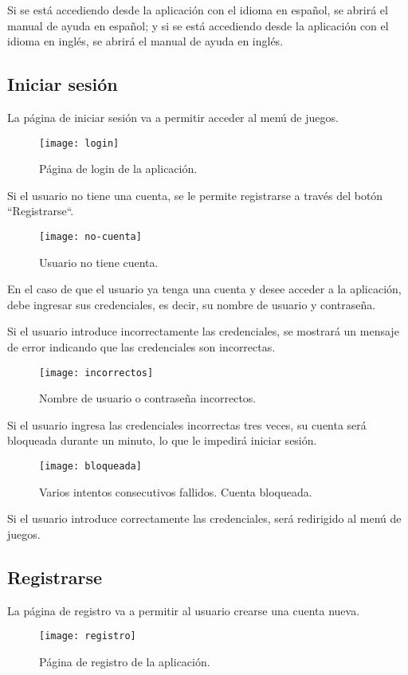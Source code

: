 Si se está accediendo desde la aplicación con el idioma en español, se abrirá el manual de ayuda en español; y si se está accediendo desde la aplicación con el idioma en inglés, se abrirá el manual de ayuda en inglés.

\subsection{Iniciar sesión}
La página de iniciar sesión va a permitir acceder al menú de juegos.

\begin{figure}[htb]
\centering
\texttt{[image: login]}
\caption{Página de login de la aplicación.}
\label{fig:login}
\end{figure}

Si el usuario no tiene una cuenta, se le permite registrarse a través del botón ``Registrarse``.

\begin{figure}[htb]
\centering
\texttt{[image: no-cuenta]}
\caption{Usuario no tiene cuenta.}
\label{fig:no-cuenta}
\end{figure}

En el caso de que el usuario ya tenga una cuenta y desee acceder a la aplicación, debe ingresar sus credenciales, es decir, su nombre de usuario y contraseña.

Si el usuario introduce incorrectamente las credenciales, se mostrará un mensaje de error indicando que las credenciales son incorrectas.
\begin{figure}[htb]
\centering
\texttt{[image: incorrectos]}
\caption{Nombre de usuario o contraseña incorrectos.}
\label{fig:incorrectos}
\end{figure}

Si el usuario ingresa las credenciales incorrectas tres veces, su cuenta será bloqueada durante un minuto, lo que le impedirá iniciar sesión.
\begin{figure}[htb]
\centering
\texttt{[image: bloqueada]}
\caption{Varios intentos consecutivos fallidos. Cuenta bloqueada.}
\label{fig:bloqueada}
\end{figure}

Si el usuario introduce correctamente las credenciales, será redirigido al menú de juegos.

\subsection{Registrarse}
La página de registro va a permitir al usuario crearse una cuenta nueva.
\begin{figure}[htb]
\centering
\texttt{[image: registro]}
\caption{Página de registro de la aplicación.}
\label{fig:registro}
\end{figure}


